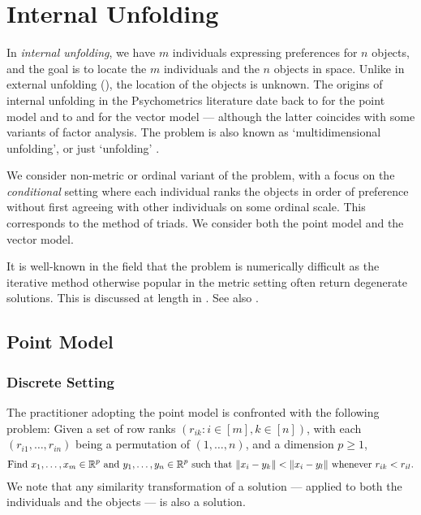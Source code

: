 \documentclass[twoside, 11pt]{article}
\begin{document}
\section{Internal Unfolding} 
\label{sec:internal}

In {\em internal unfolding}, we have $m$ individuals expressing preferences for $n$ objects, and the goal is to locate the $m$ individuals and the $n$ objects in space. Unlike in external unfolding (), the location of the objects is unknown.
The origins of internal unfolding in the Psychometrics literature date back to \citet{coombs1950psychological} for the point model and to \citet{bennett1956determination} and \citet{tucker1960intra} for the vector model --- although the latter coincides with some variants of factor analysis. 
The problem is also known as `multidimensional unfolding', or just `unfolding'  \cite{borg2005modern}.  

We consider non-metric or ordinal variant of the problem, with a focus on the {\em conditional} setting where each individual ranks the objects in order of preference without first agreeing with other individuals on some ordinal scale. This corresponds to the method of triads. We consider both the point model and the vector model.

It is well-known in the field that the problem is numerically difficult as the iterative method otherwise popular in the metric setting often return degenerate solutions. This is discussed at length in \cite{busing2005avoiding}. See also \cite[Ch 14, 15]{borg2005modern}.


\subsection{Point Model}
\label{sec:internal_point}

\subsubsection{Discrete Setting}
\label{sec:internal point discrete}
The practitioner adopting the point model is confronted with the following problem: 
Given a set of row ranks $(r_{ik} : i \in [m], k \in [n])$, with each $(r_{i1}, \dots, r_{in})$ being a permutation of $(1, \dots, n)$, and a dimension $p \ge 1$, 
\begin{equation}\label{internal point problem}
\begin{gathered}
\text{Find $x_1, \dots, x_m \in \mathbb{R}^p$ and $y_1, \dots, y_n \in \mathbb{R}^p$ such that $\|x_i-y_k\| < \|x_i-y_l\|$ whenever $r_{ik} < r_{il}$.}
\end{gathered}
\end{equation}
We note that any similarity transformation of a solution --- applied to both the individuals and the objects --- is also a solution.
\end{document}

